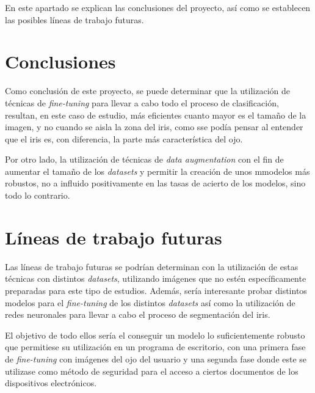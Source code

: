  \label{capitulo7}

En este apartado se explican las conclusiones del proyecto, así como se establecen las posibles líneas de trabajo futuras.

\section{Conclusiones}

Como conclusión de este proyecto, se puede determinar que la utilización de técnicas de \textit{fine-tuning} para llevar a cabo todo el proceso de clasificación,
resultan, en este caso de estudio, más eficientes cuanto mayor es el tamaño de la imagen, y no cuando se aisla la zona del iris, como sse podía pensar al entender
que el iris es, con diferencia, la parte más característica del ojo. 

Por otro lado, la utilización de técnicas de \textit{data augmentation} con el fin de aumentar el tamaño de los \textit{datasets} y permitir la creación de unos mmodelos más robustos,
no a influido positivamente en las tasas de acierto de los modelos, sino todo lo contrario.


\section{Líneas de trabajo futuras}

Las líneas de trabajo futuras se podrían determinan con la utilización de estas técnicas con distintos \textit{datasets}, utilizando imágenes que no estén específicamente preparadas
para este tipo de estudios. Además, sería interesante probar distintos modelos para el \textit{fine-tuning} de los distintos \textit{datasets} así como la utilización de redes neuronales
para llevar a cabo el proceso de segmentación del iris.

El objetivo de todo ellos sería el conseguir un modelo lo suficientemente robusto
que permitiese su utilización en un programa de escritorio, con una primera fase de \textit{fine-tuning} con imágenes del ojo del usuario y una segunda fase donde este 
se utilizase como método de seguridad para el acceso a ciertos documentos de los dispositivos electrónicos.